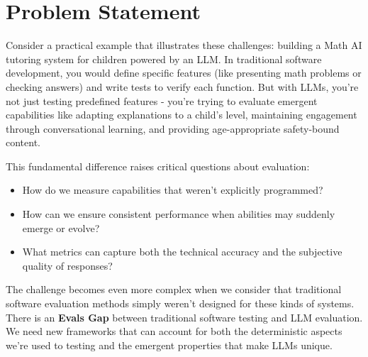 \section{Problem Statement}

Consider a practical example that illustrates these challenges: building a Math AI tutoring system for children powered by an LLM. In traditional software development, you would define specific features (like presenting math problems or checking answers) and write tests to verify each function. But with LLMs, you're not just testing predefined features - you're trying to evaluate emergent capabilities like adapting explanations to a child's level, maintaining engagement through conversational learning, and providing age-appropriate safety-bound content.

This fundamental difference raises critical questions about evaluation:
\begin{itemize}
    \item How do we measure capabilities that weren't explicitly programmed?
    \item How can we ensure consistent performance when abilities may suddenly emerge or evolve?
    \item What metrics can capture both the technical accuracy and the subjective quality of responses?
\end{itemize}

The challenge becomes even more complex when we consider that traditional software evaluation methods simply weren't designed for these kinds of systems. There is an \textbf{Evals Gap} between traditional software testing and LLM evaluation. We need new frameworks that can account for both the deterministic aspects we're used to testing and the emergent properties that make LLMs unique. 

